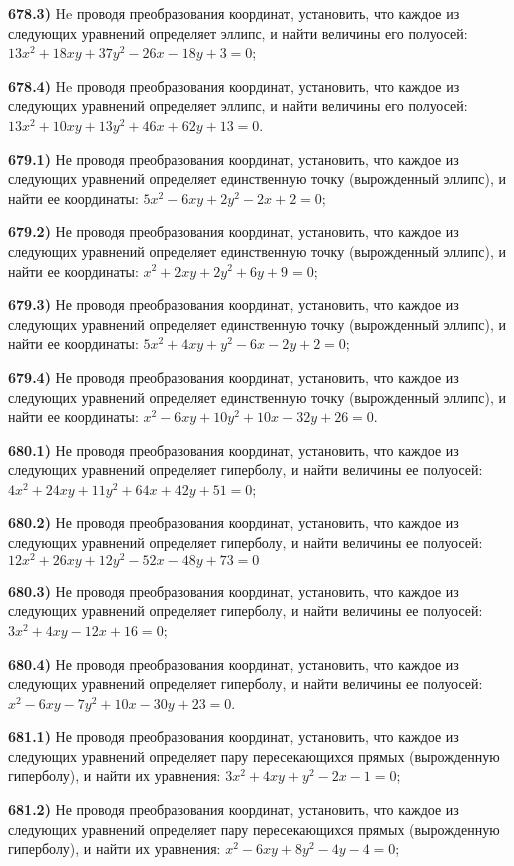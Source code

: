 \textbf{678.3)} He проводя преобразования координат, установить, что каждое из следующих уравнений определяет эллипс, и найти величины его полуосей: $13 x^2+18 x y+37 y^2-26 x-18 y+3=0$;

\textbf{678.4)} He проводя преобразования координат, установить, что каждое из следующих уравнений определяет эллипс, и найти величины его полуосей: $13 x^2+10 x y+13 y^2+46 x+62 y+13=0$.

\textbf{679.1)} Не проводя преобразования координат, установить, что каждое из следующих уравнений определяет единственную точку (вырожденный эллипс), и найти ее координаты: $5 x^2-6 x y+2 y^2-2 x+2=0$;

\textbf{679.2)} Не проводя преобразования координат, установить, что каждое из следующих уравнений определяет единственную точку (вырожденный эллипс), и найти ее координаты: $x^2+2 x y+2 y^2+6 y+9=0$;

\textbf{679.3)} Не проводя преобразования координат, установить, что каждое из следующих уравнений определяет единственную точку (вырожденный эллипс), и найти ее координаты: $5 x^2+4 x y+y^2-6 x-2 y+2=0$;

\textbf{679.4)} Не проводя преобразования координат, установить, что каждое из следующих уравнений определяет единственную точку (вырожденный эллипс), и найти ее координаты: $x^2-6 x y+10 y^2+10 x-32 y+26=0$.

\textbf{680.1)} Не проводя преобразования координат, установить, что каждое из следующих уравнений определяет гиперболу, и найти величины ее полуосей: $4 x^2+24 x y+11 y^2+64 x+42 y+51=0$;

\textbf{680.2)} Не проводя преобразования координат, установить, что каждое из следующих уравнений определяет гиперболу, и найти величины ее полуосей: $12 x^2+26 x y+12 y^2-52 x-48 y+73=0$

\textbf{680.3)} Не проводя преобразования координат, установить, что каждое из следующих уравнений определяет гиперболу, и найти величины ее полуосей: $3 x^2+4 x y-12 x+16=0$;

\textbf{680.4)} Не проводя преобразования координат, установить, что каждое из следующих уравнений определяет гиперболу, и найти величины ее полуосей: $x^2-6 x y-7 y^2+10 x-30 y+23=0$.

\textbf{681.1)} Не проводя преобразования координат, установить, что каждое из следующих уравнений определяет пару пересекающихся прямых (вырожденную гиперболу), и найти их уравнения: $3 x^2+4 x y+y^2-2 x-1=0$;

\textbf{681.2)} Не проводя преобразования координат, установить, что каждое из следующих уравнений определяет пару пересекающихся прямых (вырожденную гиперболу), и найти их уравнения: $x^2-6 x y+8 y^2-4 y-4=0$;

